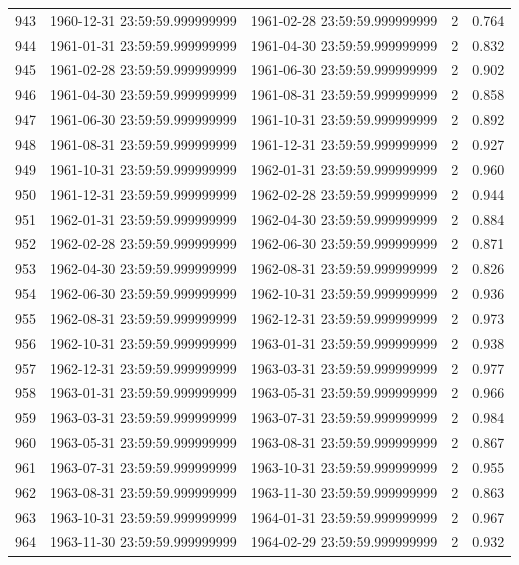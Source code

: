 \begin{table}
\begin{tabular}{lcccc}
943 & 1960-12-31 23:59:59.999999999 & 1961-02-28 23:59:59.999999999 & 2 & 0.764 \\
944 & 1961-01-31 23:59:59.999999999 & 1961-04-30 23:59:59.999999999 & 2 & 0.832 \\
945 & 1961-02-28 23:59:59.999999999 & 1961-06-30 23:59:59.999999999 & 2 & 0.902 \\
946 & 1961-04-30 23:59:59.999999999 & 1961-08-31 23:59:59.999999999 & 2 & 0.858 \\
947 & 1961-06-30 23:59:59.999999999 & 1961-10-31 23:59:59.999999999 & 2 & 0.892 \\
948 & 1961-08-31 23:59:59.999999999 & 1961-12-31 23:59:59.999999999 & 2 & 0.927 \\
949 & 1961-10-31 23:59:59.999999999 & 1962-01-31 23:59:59.999999999 & 2 & 0.960 \\
950 & 1961-12-31 23:59:59.999999999 & 1962-02-28 23:59:59.999999999 & 2 & 0.944 \\
951 & 1962-01-31 23:59:59.999999999 & 1962-04-30 23:59:59.999999999 & 2 & 0.884 \\
952 & 1962-02-28 23:59:59.999999999 & 1962-06-30 23:59:59.999999999 & 2 & 0.871 \\
953 & 1962-04-30 23:59:59.999999999 & 1962-08-31 23:59:59.999999999 & 2 & 0.826 \\
954 & 1962-06-30 23:59:59.999999999 & 1962-10-31 23:59:59.999999999 & 2 & 0.936 \\
955 & 1962-08-31 23:59:59.999999999 & 1962-12-31 23:59:59.999999999 & 2 & 0.973 \\
956 & 1962-10-31 23:59:59.999999999 & 1963-01-31 23:59:59.999999999 & 2 & 0.938 \\
957 & 1962-12-31 23:59:59.999999999 & 1963-03-31 23:59:59.999999999 & 2 & 0.977 \\
958 & 1963-01-31 23:59:59.999999999 & 1963-05-31 23:59:59.999999999 & 2 & 0.966 \\
959 & 1963-03-31 23:59:59.999999999 & 1963-07-31 23:59:59.999999999 & 2 & 0.984 \\
960 & 1963-05-31 23:59:59.999999999 & 1963-08-31 23:59:59.999999999 & 2 & 0.867 \\
961 & 1963-07-31 23:59:59.999999999 & 1963-10-31 23:59:59.999999999 & 2 & 0.955 \\
962 & 1963-08-31 23:59:59.999999999 & 1963-11-30 23:59:59.999999999 & 2 & 0.863 \\
963 & 1963-10-31 23:59:59.999999999 & 1964-01-31 23:59:59.999999999 & 2 & 0.967 \\
964 & 1963-11-30 23:59:59.999999999 & 1964-02-29 23:59:59.999999999 & 2 & 0.932 \\

\end{tabular}
\end{table}
